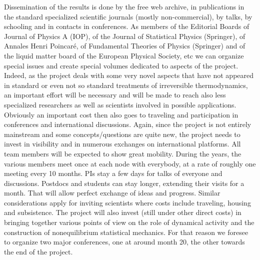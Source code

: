Dissemination of the results is done by the free web archive, in publications in the
standard specialized scientific journals (mostly non-commercial), by talks, by schooling and
in contacts in conferences. As members of the Editorial Boards of Journal of Physics A  (IOP), of the Journal of Statistical Physics (Springer), of Annales Henri Poincar\'e, of
Fundamental Theories of Physics (Springer) and of the liquid matter board of the European Physical Society, etc we can organize special issues and create
special volumes dedicated to aspects of the project. Indeed, as the project deals with some
very novel aspects that have not appeared in standard or even not so standard treatments of
irreversible thermodynamics, an important effort will be necessary and will be made to reach
also less specialized researchers as well as scientists involved in possible applications.
%
Obviously an important cost then also goes to traveling and participation in conferences and
international discussions. Again, since the project is not entirely mainstream and some
concepts/questions are quite new, the project needs to invest in visibility and in numerous
exchanges on international platforms.  All team members will be
expected to show great mobility.  During the years, the various members meet once at each
node with everybody, at a rate of roughly one meeting every 10 months. PIs stay a few days
for talks of everyone and discussions. Postdocs and students can stay
longer, extending their visits for a month. That will allow perfect exchange of ideas and
progress.  Similar considerations apply for inviting scientists where
costs include traveling, housing and subsistence.  The project will also invest (still under other
direct costs) in bringing together various points of view on the role of dynamical activity
and the construction of nonequilibrium statistical mechanics. For that reason we foresee to
organize two major conferences, one at around month 20, the other towards the end of the
project.  


